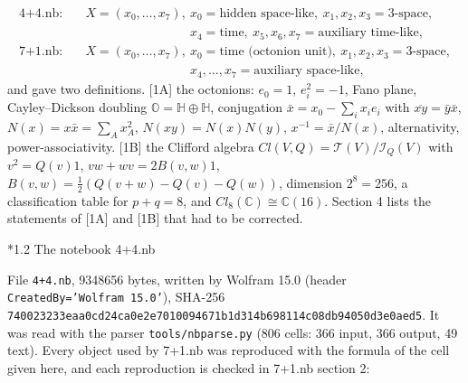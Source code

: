 \documentclass[10pt,a4paper]{article}
\makeatletter
\renewcommand\subsection{\@startsection{subsection}{2}{\z@}{-3.25ex\@plus -1ex \@minus -.2ex}{1.5ex \@plus .2ex}{\normalfont\large\bfseries\raggedright}}
\makeatother
\begin{document}
\begin{align*}
\text{4+4.nb:}\quad &X=(x_0,\dots,x_7),\ x_0=\text{hidden space-like},\ x_1,x_2,x_3=\text{3-space}, \\
&\phantom{X=(x_0,\dots,x_7),\ }x_4=\text{time},\ x_5,x_6,x_7=\text{auxiliary time-like}, \\
\text{7+1.nb:}\quad &X=(x_0,\dots,x_7),\ x_0=\text{time (octonion unit)},\ x_1,x_2,x_3=\text{3-space}, \\
&\phantom{X=(x_0,\dots,x_7),\ }x_4,\dots,x_7=\text{auxiliary space-like},
\end{align*}
and gave two definitions. [1A] the octonions: $e_0=1$, $e_i^2=-1$, Fano plane, Cayley–Dickson doubling $\mathbb O=\mathbb H\oplus\mathbb H$, conjugation $\bar x=x_0-\sum_ix_ie_i$ with $\overline{xy}=\bar y\bar x$, $N(x)=x\bar x=\sum_Ax_A^2$, $N(xy)=N(x)N(y)$, $x^{-1}=\bar x/N(x)$, alternativity, power-associativity. [1B] the Clifford algebra $Cl(V,Q)=\mathcal T(V)/\mathcal I_Q(V)$ with $v^2=Q(v)1$, $vw+wv=2B(v,w)1$, $B(v,w)=\frac12(Q(v+w)-Q(v)-Q(w))$, dimension $2^8=256$, a classification table for $p+q=8$, and $Cl_8(\mathbb C)\cong\mathbb C(16)$. Section 4 lists the statements of [1A] and [1B] that had to be corrected.

\subsection*{1.2 The notebook 4+4.nb}
File \texttt{4+4.nb}, 9348656 bytes, written by Wolfram 15.0 (header \texttt{CreatedBy='Wolfram 15.0'}), SHA-256 \texttt{74002323\allowbreak{}3eaa0cd2\allowbreak{}4ca0e2e7\allowbreak{}01009467\allowbreak{}1b1d314b\allowbreak{}698114c0\allowbreak{}8db94050\allowbreak{}d3e0aed5}. It was read with the parser \texttt{tools/\allowbreak{}nbparse.py} (806 cells: 366 input, 366 output, 49 text). Every object used by 7+1.nb was reproduced with the formula of the cell given here, and each reproduction is checked in 7+1.nb section 2:
\end{document}

